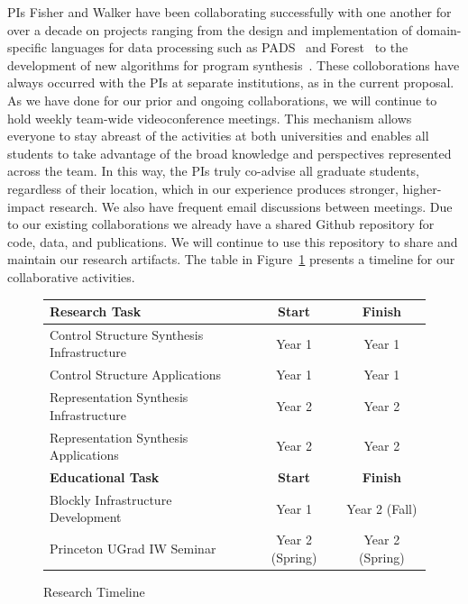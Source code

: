 PIs Fisher and Walker have been collaborating successfully
with one another for over a decade on projects ranging from the design
and implementation of domain-specific languages for data processing
such as
PADS~\cite{fisher+:next-700,fisher+:pads-overview,mandelbaum:pads-ml}
and Forest~\cite{fisher+:forest} to the development of new algorithms
for program
synthesis~\cite{fisher+:learnpads,miltner+:synthesizing-bijective-lenses,zhu+:learnpads2}.
These colloborations have always occurred with the PIs at separate
institutions, as in the current proposal.  As we have done for our
prior and ongoing collaborations, we will continue to hold weekly
team-wide videoconference meetings.  This mechanism allows everyone to
stay abreast of the activities at both universities and enables all
students to take advantage of the broad knowledge and perspectives
represented across the team.  In this way, the PIs truly co-advise all
graduate students, regardless of their location, which in our
experience produces stronger, higher-impact research.  We also have
frequent email discussions between meetings.  Due to our existing
collaborations we already have a shared Github repository for code,
data, and publications.  We will continue to use this repository to
share and maintain our research artifacts.  The table in
Figure~\ref{fig:timeline} presents a timeline for our collaborative
activities.

\begin{figure}[!hbt]
\begin{small}
\centering
\begin{tabular}{|l|c|c|}
\hline\hline
{\bf Research Task} & {\bf Start} & {\bf Finish} \\
\hline\hline
Control Structure Synthesis Infrastructure & Year 1 & Year 1\\\hline
Control Structure Applications  & Year 1& Year 1 \\\hline
Representation Synthesis Infrastructure & Year 2 & Year 2\\\hline
Representation Synthesis Applications  & Year 2 & Year 2\\\hline\hline
{\bf Educational Task} & {\bf Start} & {\bf Finish} \\\hline\hline
Blockly Infrastructure Development & Year 1 & Year 2 (Fall) \\\hline
Princeton UGrad IW Seminar & Year 2 (Spring) & Year 2 (Spring) \\\hline\hline
\end{tabular}
\end{small}
\caption{Research Timeline}\label{fig:timeline}
\end{figure} 

